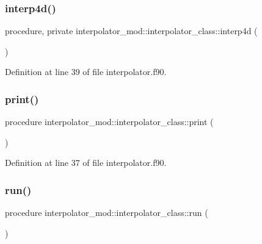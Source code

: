 \subsubsection{\texorpdfstring{interp4d()}{interp4d()}}
{\footnotesize\ttfamily procedure, private interpolator\+\_\+mod\+::interpolator\+\_\+class\+::interp4d (\begin{DoxyParamCaption}{ }\end{DoxyParamCaption})\hspace{0.3cm}{\ttfamily [private]}}



Definition at line 39 of file interpolator.\+f90.

\mbox{\label{structinterpolator__mod_1_1interpolator__class_a4b3112a37f09901a223d8cc3d81be4dd}} 
\subsubsection{\texorpdfstring{print()}{print()}}
{\footnotesize\ttfamily procedure interpolator\+\_\+mod\+::interpolator\+\_\+class\+::print (\begin{DoxyParamCaption}{ }\end{DoxyParamCaption})\hspace{0.3cm}{\ttfamily [private]}}



Definition at line 37 of file interpolator.\+f90.

\mbox{\label{structinterpolator__mod_1_1interpolator__class_a1080aca342174069db9c5639853d5dc0}} 
\subsubsection{\texorpdfstring{run()}{run()}}
{\footnotesize\ttfamily procedure interpolator\+\_\+mod\+::interpolator\+\_\+class\+::run (\begin{DoxyParamCaption}{ }\end{DoxyParamCaption})\hspace{0.3cm}{\ttfamily [private]}}



